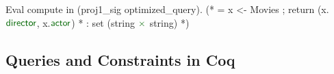 \documentclass{sigplanconf}
\begin{document}
\begin{coq}
Eval compute in (proj1_sig optimized_query).
(* = x <- Movies ; return (x.$\textcolor{dkgreen}{\textsf{director}}$, x.$\textcolor{dkgreen}{\textsf{actor}}$)
 *   : set (string $\textcolor{dkgreen}{\times}$ string)   *)
\end{coq}


 



\subsection{Queries and Constraints in Coq}
\end{document}
